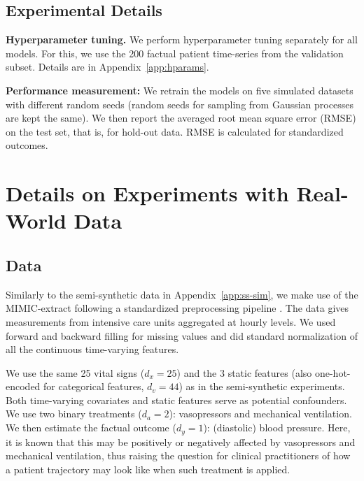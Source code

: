 \documentclass{article}
\theoremstyle{plain}
\theoremstyle{definition}
\theoremstyle{remark}
\begin{document}
\subsection{Experimental Details}

\textbf{Hyperparameter tuning.} We perform hyperparameter tuning separately for all models. For this, we use the 200 factual patient time-series from the validation subset. Details are in Appendix~\ref{app:hparams}.

\textbf{Performance measurement:} We retrain the models on five simulated datasets with different random seeds (random seeds for sampling from Gaussian processes are kept the same). We then report the averaged root mean square error (RMSE) on the test set, that is, for hold-out data. RMSE is calculated for standardized outcomes.


\clearpage
\section{Details on Experiments with Real-World Data} \label{app:real-world-data}

\subsection{Data} 

Similarly to the semi-synthetic data in Appendix~\ref{app:ss-sim}, we make use of the MIMIC-extract following a standardized preprocessing pipeline \cite{wang2020mimic}. The data gives measurements from intensive care units aggregated at hourly levels. We used forward and backward filling for missing values and did standard normalization of all the continuous time-varying features.

We use the same 25 vital signs ($d_x = 25$) and the 3 static features (also one-hot-encoded for categorical features, $d_v = 44$) as in the semi-synthetic experiments. Both time-varying covariates and static features serve as potential confounders. We use two binary treatments ($d_a = 2$): vasopressors and mechanical ventilation. We then estimate the factual outcome ($d_y = 1$): (diastolic) blood pressure. Here, it is known that this may be positively or negatively affected by vasopressors and mechanical ventilation, thus raising the question for clinical practitioners of how a patient trajectory may look like when such treatment is applied. 
\end{document}
